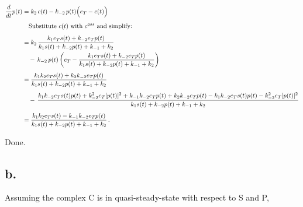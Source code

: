 \documentclass[8pt, fleqn]{report}
\begin{document}
\begin{align*}
    \frac{d}{dt} p(t)
     & = k_2\, c(t) - k_{-2}\, p(t)\Bigl(e_T - c(t)\Bigr)                        \\[1ex]
     & \quad \text{Substitute } c(t) \text{ with } c^{qss} \text{ and simplify:} \\[1ex]
     & = k_2\, \frac{k_1 e_T s(t) + k_{-2} e_T p(t)}
    {k_1 s(t) + k_{-2} p(t) + k_{-1} + k_2}                                      \\
     & \quad -\, k_{-2}\, p(t) \left(
    e_T - \frac{k_1 e_T s(t) + k_{-2} e_T p(t)}
    {k_1 s(t) + k_{-2} p(t) + k_{-1} + k_2} \right)                              \\[1ex]
     & = \frac{k_1 k_2 e_T s(t) + k_2 k_{-2} e_T p(t)}
    {k_1 s(t) + k_{-2} p(t) + k_{-1} + k_2}                                      \\[1ex]
     & \quad -\, \frac{
    k_1 k_{-2} e_T s(t) p(t)
    + k_{-2}^2 e_T [p(t)]^2
    + k_{-1} k_{-2} e_T p(t)
    + k_2 k_{-2} e_T p(t)
    - k_1 k_{-2} e_T s(t) p(t)
    - k_{-2}^2 e_T [p(t)]^2
    }{k_1 s(t) + k_{-2} p(t) + k_{-1} + k_2}                                     \\[1ex]
     & = \frac{k_1 k_2 e_T s(t) - k_{-1} k_{-2} e_T p(t)}
    {k_1 s(t) + k_{-2} p(t) + k_{-1} + k_2}\,.
\end{align*}

Done.

\subsection*{b.}

Assuming the complex C is in quasi-steady-state with respect to S and P,
\end{document}
